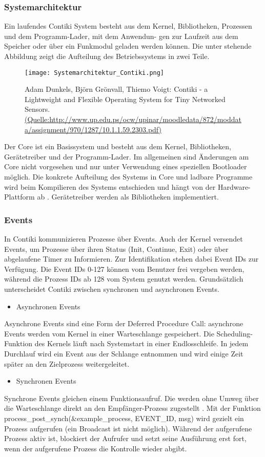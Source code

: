 \subsubsection{Systemarchitektur}
Ein laufendes Contiki System besteht aus dem Kernel, Bibliotheken, Prozessen und dem Programm-Lader, mit dem Anwendun-
gen zur Laufzeit aus dem Speicher oder \"uber ein Funkmodul geladen werden k\"onnen. Die unter stehende Abbildung zeigt die Aufteilung des Betriebssystems in zwei Teile. 
\begin{figure}[h!]
	\centering
		\texttt{[image: Systemarchitektur\_Contiki.png]}
	\caption{Adam Dunkels, Bj\"orn Gr\"onvall, Thiemo Voigt: Contiki - a Lightweight and Flexible Operating System for Tiny Networked Sensors. \url{(Quelle:http://www.up.edu.ps/ocw/upinar/moodledata/872/moddata/assignment/970/1287/10.1.1.59.2303.pdf)}}
	\label{Systemarchitektur von Contiki}
\end{figure}
Der Core ist ein Basissystem und besteht aus dem Kernel, Bibliotheken, Ger\"{a}tetreiber und der Programm-Lader. Im allgemeinen sind \"Anderungen am Core nicht vorgesehen und nur unter Verwendung eines speziellen Bootloader m\"oglich. Die konkrete Aufteilung des Systems in Core und ladbare Programme wird beim Kompilieren des Systems entschieden und h\"angt von der Hardware-Plattform ab \cite[S. 7]{Walter:2010}. Ger\"atetreiber werden als Bibliotheken implementiert. 

\subsubsection{Events}
In Contiki kommunizieren Prozesse \"uber Events. Auch der Kernel versendet Events, um Prozesse \"uber ihren Status (Init, Continue, Exit) oder \"uber abgelaufene Timer zu Informieren. Zur Identifikation stehen dabei Event IDs zur Verf\"ugung. Die Event IDs 0-127 k\"onnen vom Benutzer frei vergeben werden, w\"ahrend die Prozess IDs ab 128 vom System genutzt werden. Grunds\"atzlich unterscheidet Contiki zwischen synchronen und asynchronen Events. 
\begin{itemize}
\item Asynchronen Events
\end{itemize}
Asynchrone Events sind eine Form der Deferred Procedure Call: asynchrone Events werden vom Kernel in einer Warteschlange gespeichert. Die Scheduling-Funktion des Kernels l\"auft nach Systemstart in einer Endlosschleife. In jedem Durchlauf wird ein Event aus der Schlange entnommen und wird einige Zeit sp\"ater an den Zielprozess weitergeleitet.
\begin{itemize}
\item Synchronen Events
\end{itemize}
Synchrone Events gleichen einem Funktionsaufruf. Die werden ohne Umweg \"uber die Warteschlange direkt an den Empf\"anger-Prozess zugestellt \cite[S. 7]{Walter:2010}.  Mit der Funktion process\_post\_synch(\&example\_process, EVENT\_ID, msg) wird gezielt ein Prozess aufgerufen (ein Broadcast ist nicht m\"oglich). W\"ahrend der aufgerufene Prozess aktiv ist, blockiert der Aufrufer und setzt seine Ausführung erst fort, wenn der aufgerufene Prozess die Kontrolle wieder abgibt.

